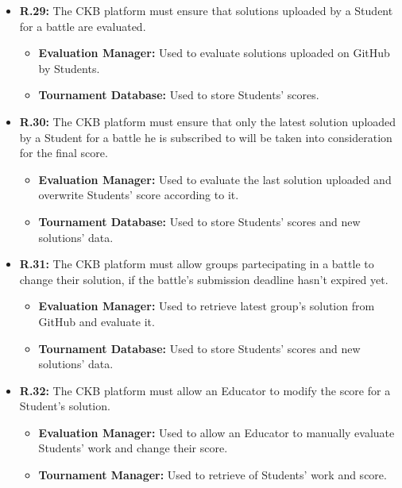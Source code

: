 \documentclass{article}
\begin{document}
{\begin{itemize}
\begin{itemize}
\begin{itemize}
              \item \textbf{Tournament Database:} Used to store battle registration's data.
          \end{itemize}
    \item \textbf{R.29:} The CKB platform must ensure that solutions uploaded by a Student for a battle are evaluated.
          \begin{itemize}
              \item \textbf{Evaluation Manager:} Used to evaluate solutions uploaded on GitHub by Students.
              \item \textbf{Tournament Database:} Used to store Students' scores.
          \end{itemize}
    \item \textbf{R.30:} The CKB platform must ensure that only the latest solution uploaded by a Student for a battle he is subscribed to will
          be taken into consideration for the final score.
          \begin{itemize}
              \item \textbf{Evaluation Manager:} Used to evaluate the last solution uploaded and
              overwrite Students' score according to it.
              \item \textbf{Tournament Database:} Used to store Students' scores and new solutions' data.
          \end{itemize}
    \item \textbf{R.31:} The CKB platform must allow groups partecipating in a battle to change their solution,
          if the battle's submission deadline hasn't expired yet.
          \begin{itemize}
            \item \textbf{Evaluation Manager:} Used to retrieve latest group's solution from GitHub and evaluate it.
              \item \textbf{Tournament Database:} Used to store Students' scores and new solutions' data.
          \end{itemize}
    \item \textbf{R.32:} The CKB platform must allow an Educator to modify the score for a Student's solution.
          \begin{itemize}
              \item \textbf{Evaluation Manager:} Used to allow an Educator to manually evaluate Students'
              work and change their score.
              \item \textbf{Tournament Manager:} Used to retrieve of Students' work and score.

\end{itemize}
\end{itemize}
\end{itemize}}
\end{document}

